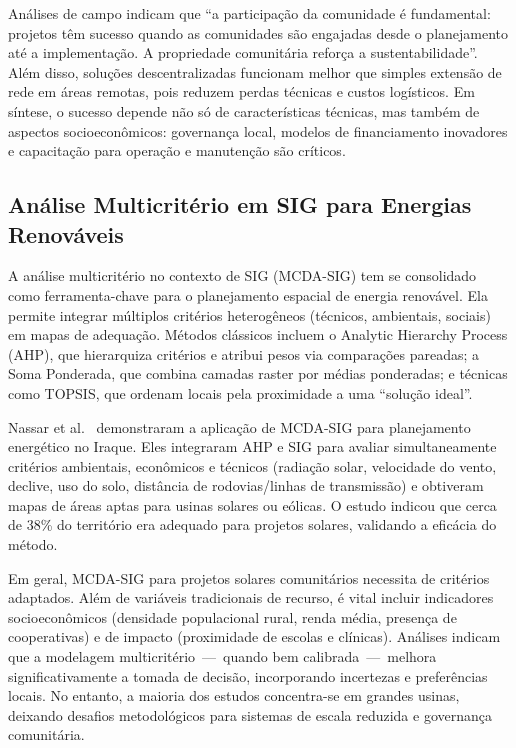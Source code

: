 \documentclass[12pt, a4paper]{article}
\begin{document}
Análises de campo indicam que ``a participação da comunidade é fundamental: projetos têm sucesso quando as comunidades são engajadas desde o planejamento até a implementação. A propriedade comunitária reforça a sustentabilidade''. Além disso, soluções descentralizadas funcionam melhor que simples extensão de rede em áreas remotas, pois reduzem perdas técnicas e custos logísticos. Em síntese, o sucesso depende não só de características técnicas, mas também de aspectos socioeconômicos: governança local, modelos de financiamento inovadores e capacitação para operação e manutenção são críticos.

\subsection{Análise Multicritério em SIG para Energias Renováveis}

A análise multicritério no contexto de SIG (MCDA-SIG) tem se consolidado como ferramenta-chave para o planejamento espacial de energia renovável. Ela permite integrar múltiplos critérios heterogêneos (técnicos, ambientais, sociais) em mapas de adequação. Métodos clássicos incluem o Analytic Hierarchy Process (AHP), que hierarquiza critérios e atribui pesos via comparações pareadas; a Soma Ponderada, que combina camadas raster por médias ponderadas; e técnicas como TOPSIS, que ordenam locais pela proximidade a uma ``solução ideal''.

Nassar et al.~\citep{Nassar2025} demonstraram a aplicação de MCDA-SIG para planejamento energético no Iraque. Eles integraram AHP e SIG para avaliar simultaneamente critérios ambientais, econômicos e técnicos (radiação solar, velocidade do vento, declive, uso do solo, distância de rodovias/linhas de transmissão) e obtiveram mapas de áreas aptas para usinas solares ou eólicas. O estudo indicou que cerca de 38\% do território era adequado para projetos solares, validando a eficácia do método.

Em geral, MCDA-SIG para projetos solares comunitários necessita de critérios adaptados. Além de variáveis tradicionais de recurso, é vital incluir indicadores socioeconômicos (densidade populacional rural, renda média, presença de cooperativas) e de impacto (proximidade de escolas e clínicas). Análises indicam que a modelagem multicritério~---~quando bem calibrada~---~melhora significativamente a tomada de decisão, incorporando incertezas e preferências locais. No entanto, a maioria dos estudos concentra-se em grandes usinas, deixando desafios metodológicos para sistemas de escala reduzida e governança comunitária.
\end{document}
